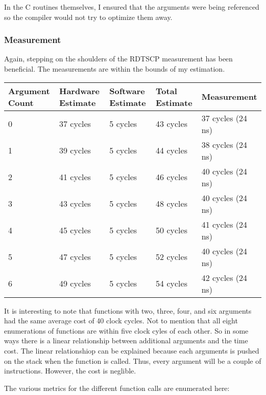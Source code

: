 \documentclass[paper=a4, fontsize=11pt]{scrartcl}
\numberwithin{equation}{section}        %
\numberwithin{figure}{section}          %
\numberwithin{table}{section}               %
\begin{document}
In the C routines themselves, I ensured that the arguments were being referenced so the compiler would not try to optimize them away.

\subsubsection{Measurement}

Again, stepping on the shoulders of the RDTSCP measurement has been beneficial.  The measurements are within the bounds of my estimation.

\begin{center}
    \begin{tabular}{ | l| l | l | l | l |}
    \hline
    Argument Count & Hardware Estimate & Software Estimate & Total Estimate & Measurement \\ \hline
    0 & 37 cycles & 5 cycles & 43 cycles & 37 cycles (24 ns) \\ \hline
    1 & 39 cycles & 5 cycles & 44 cycles & 38 cycles (24 ns) \\  \hline
    2 & 41 cycles & 5 cycles & 46 cycles & 40 cycles (24 ns) \\  \hline
    3 & 43 cycles & 5 cycles & 48 cycles & 40 cycles (24 ns) \\  \hline
    4 & 45 cycles & 5 cycles & 50 cycles & 41 cycles (24 ns) \\  \hline
    5 & 47 cycles & 5 cycles & 52 cycles & 40 cycles (24 ns) \\  \hline
    6 & 49 cycles & 5 cycles & 54 cycles & 42 cycles (24 ns) \\ 
    \hline
    \end{tabular}
\end{center}

It is interesting to note that functions with two, three, four, and six arguments had the same average cost of 40 clock cycles.  Not to mention that all eight enumerations of functions are within five clock cyles of each other.  So in some ways there is a linear relationship between additional arguments and the time cost.  The linear relationshiop can be explained because each arguments is pushed on the stack when the function is called.  Thus, every argument will be a couple of instructions.  However, the cost is neglible.

The various metrics for the different function calls are enumerated here:
\end{document}
